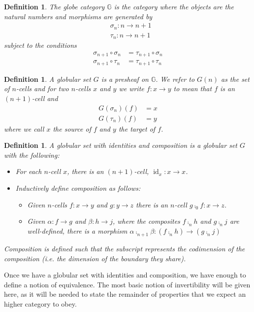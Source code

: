 \documentclass[draft]{article}
\renewcommand{\comment}[1]{\todo[color=green!40]{#1}}
\newtheorem{definition}[theorem]{Definition} \theoremstyle{remark}
\DeclareMathOperator{\id}{id}
\begin{document}
\begin{definition}
  The \emph{globe category} \(\mathbb{G}\) is the category where the
  objects are the natural numbers and morphisms are generated by
  \begin{align*}
    &\sigma_n : n \to n+1\\
    &\tau_n : n \to n+1
  \end{align*}
  subject to the conditions
  \begin{align*}
    \sigma_{n + 1} \circ \sigma_n &= \tau_{n + 1} \circ \sigma_n\\
    \sigma_{n + 1} \circ \tau_n &= \tau_{n + 1} \circ \tau_n
  \end{align*}
\end{definition}

\begin{definition}
  A \emph{globular set} \(G\) is a presheaf on \(\mathbb{G}\). We
  refer to \(G(n)\) as the set of \(n\)-cells and for two \(n\)-cells
  \(x\) and \(y\) we write \(f: x \to y\) to mean that \(f\) is an
  \((n+1)\)-cell and
  \begin{align*}
    G(\sigma_n)(f) &= x\\
    G(\tau_n)(f) &= y
  \end{align*}
  where we call \(x\) the source of \(f\) and \(y\) the target of
  \(f\).
\end{definition}

\begin{definition}
  A \emph{globular set with identities and composition} is a globular
  set \(G\) with the following:
  \begin{itemize}
  \item For each \(n\)-cell \(x\), there is an \((n+1)\)-cell, \(\id_x
    : x \to x\).
  \item Inductively define composition as follows:
    \begin{itemize}
    \item Given \(n\)-cells \(f: x \to y\) and \(g: y \to z\) there is
      an \(n\)-cell \(g \comp_0 f: x \to z\).
    \item Given \(\alpha: f \to g\) and \(\beta: h \to j\), where the
      composites \(f \comp_n h\) and \(g \comp_n j\) are well-defined,
      there is a morphism \(\alpha \comp_{n+1} \beta: (f \comp_n h)
      \to (g \comp_n j)\)
    \end{itemize}
  \end{itemize}
  Composition is defined such that the subscript represents the
  codimension of the composition (i.e. the dimension of the boundary they share).
\end{definition}
\comment{should regular composition be \(\comp_1\)} Once we have a
globular set with identities and composition, we have enough to define
a notion of equivalence. The most basic notion of invertibility will
be given here, as it will be needed to state the remainder of
properties that we expect an higher category to obey.
\end{document}
